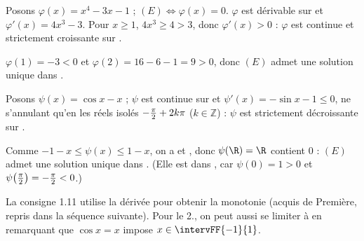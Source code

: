 \begin{corrigeprof}[12]
\be
\item Posons $\varphi(x)=x^4-3x-1$ ; $(E)\iff\varphi(x)=0$. $\varphi$ est dérivable sur \R et $\varphi'(x)=4x^3-3$. Pour $x\geq 1$, $4x^3\geq 4>3$, donc $\varphi'(x)>0$ : $\varphi$ est continue et strictement croissante sur .
\par $\varphi(1)=-3<0$ et $\varphi(2)=16-6-1=9>0$, donc $(E)$ admet une solution unique dans .
\item Posons $\psi(x)=\cos x-x$ ; $\psi$ est continue sur \R et $\psi'(x)=-\sin x-1\leq 0$, ne s'annulant qu'en les réels isolés $-\frac{\pi}{2}+2k\pi$ ($k\in\mathbb{Z}$) : $\psi$ est strictement décroissante sur \R.
\par Comme $-1-x\leq\psi(x)\leq 1-x$, on a  et , donc $\psi(\R)=\R$ contient $0$ : $(E)$ admet une solution unique dans \R. (Elle est dans , car $\psi(0)=1>0$ et $\psi\big(\frac{\pi}{2}\big)=-\frac{\pi}{2}<0$.)
\ee
\end{corrigeprof}
\begin{noteprof}
La consigne 1.11 utilise la dérivée pour obtenir la monotonie (acquis de Première, repris dans la séquence suivante). Pour le 2., on peut aussi se limiter à  en remarquant que $\cos x=x$ impose $x\in\intervFF{-1}{1}$.
\end{noteprof}
\ifenseignant
{}
